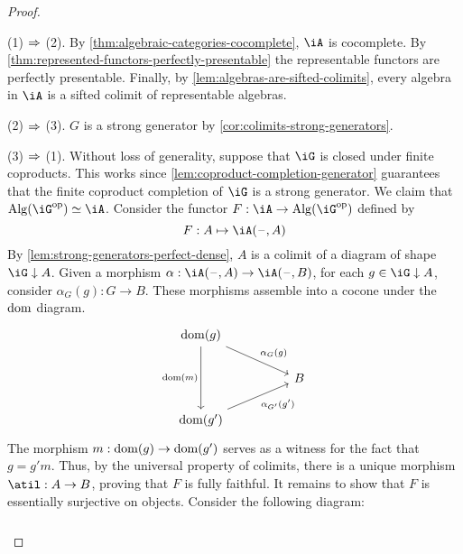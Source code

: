 \documentclass{zett}
\begin{document}
\begin{proof}
  \begin{node}
    (1) $\Rightarrow$ (2).
    By \cref{thm:algebraic-categories-cocomplete}, $\iA$ is cocomplete.
    By \cref{thm:represented-functors-perfectly-presentable} the representable functors are perfectly presentable.
    Finally, by \cref{lem:algebras-are-sifted-colimits}, every algebra in $\iA$ is a sifted colimit of representable algebras.
  \end{node}
  \begin{node}
    (2) $\Rightarrow$ (3).
    $G$ is a strong generator by \cref{cor:colimits-strong-generators}.
  \end{node}
  \begin{node}
    (3) $\Rightarrow$ (1).
    Without loss of generality, suppose that $\iG$ is closed under finite coproducts.
    This works since \cref{lem:coproduct-completion-generator} guarantees that the finite coproduct completion of $\iG$ is a strong generator.
    We claim that $\Alg(\iG\op) \eqv \iA$.
    Consider the functor $F : \iA \to \Alg(\iG\op)$ defined by
    \[
      F : A \mapsto \iA(\blank, A)
    \]
    By \cref{lem:strong-generators-perfect-dense}, $A$ is a colimit of a diagram of shape $\iG \dn A$.
    Given a morphism $\alpha : \iA(\blank, A) \to \iA(\blank, B)$, for each $g \in \iG \dn A$, consider $\alpha_{G}(g) : G \to B$.
    These morphisms assemble into a cocone under the $\operatorname{dom}$ diagram.
    \[\begin{tikzcd}
	{\dom(g)} \\
	&& B \\
	{\dom(g')}
	\arrow["{\alpha_{G}(g)}", from=1-1, to=2-3]
	\arrow["{\alpha_{G'}(g')}"', from=3-1, to=2-3]
	\arrow["{\dom(m)}"', from=1-1, to=3-1]
      \end{tikzcd}\]
    The morphism $m : \operatorname{dom}(g) \to \operatorname{dom}(g')$ serves as a witness for the fact that $g = g'm$.
    Thus, by the universal property of colimits, there is a unique morphism $\atil : A \to B$, proving that $F$ is fully faithful.
    It remains to show that $F$ is essentially surjective on objects.
    Consider the following diagram:
    \[\begin{tikzcd}

\end{tikzcd}\]
\end{node}
\end{proof}
\end{document}
